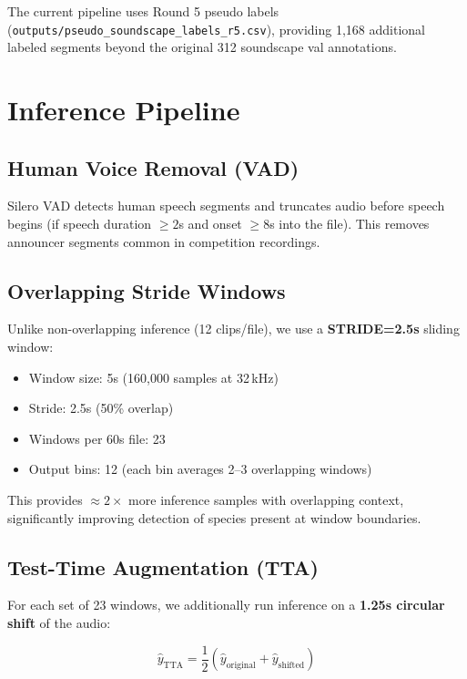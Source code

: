 \documentclass[11pt,a4paper]{article}
\begin{document}
The current pipeline uses Round 5 pseudo labels
(\texttt{outputs/pseudo\_soundscape\_labels\_r5.csv}), providing
1{,}168 additional labeled segments beyond the original 312 soundscape val annotations.

\section{Inference Pipeline}
\label{sec:inference}

\subsection{Human Voice Removal (VAD)}

Silero VAD detects human speech segments and truncates audio before speech begins
(if speech duration $\geq 2$s and onset $\geq 8$s into the file). This removes
announcer segments common in competition recordings.

\subsection{Overlapping Stride Windows}

Unlike non-overlapping inference (12 clips/file), we use a \textbf{STRIDE=2.5s}
sliding window:

\begin{itemize}[leftmargin=1.5em]
\item Window size: 5s (160{,}000 samples at 32\,kHz)
\item Stride: 2.5s (50\% overlap)
\item Windows per 60s file: 23
\item Output bins: 12 (each bin averages 2--3 overlapping windows)
\end{itemize}

This provides $\approx 2\times$ more inference samples with overlapping context,
significantly improving detection of species present at window boundaries.

\subsection{Test-Time Augmentation (TTA)}

For each set of 23 windows, we additionally run inference on a \textbf{1.25s circular
shift} of the audio:

\[
\hat{y}_{\text{TTA}} = \frac{1}{2}\left(\hat{y}_{\text{original}} + \hat{y}_{\text{shifted}}\right)
\]
\end{document}
